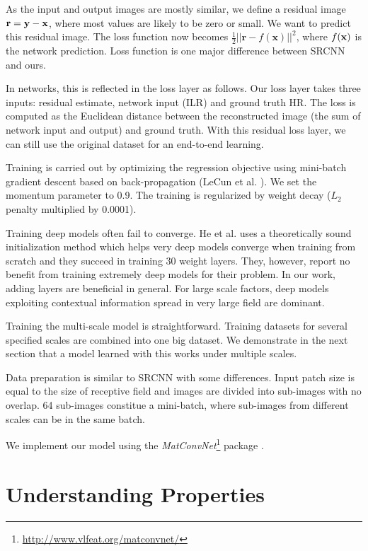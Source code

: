 \documentclass[10pt,twocolumn,letterpaper]{article}
\begin{document}
As the input and output images are mostly similar, we define a residual image ${\bf r}={\bf y}-{\bf x}$, where most values are likely to be zero or small. We want to predict this residual image. The loss function now becomes $\frac{1}{2}||\mathbf{r}-f(\mathbf{x})||^{2}$, where $f(\bf{x})$ is the network prediction. Loss function is one major difference between SRCNN and ours. 

In networks, this is reflected in the loss layer as follows. 
Our loss layer takes three inputs: residual estimate, network input (ILR) and ground truth HR. The loss is computed as the Euclidean distance between the reconstructed image (the sum of network input and output) and ground truth. With this residual loss layer, we can still use the original dataset for an end-to-end learning.

Training is carried out by optimizing the regression objective using mini-batch gradient descent based on back-propagation (LeCun et al. \cite{lecun1998gradient}). We set the momentum parameter to 0.9. The training is regularized by weight decay ($L_2$ penalty multiplied by
0.0001).  

Training deep models often fail to converge. He et al. \cite{he2015delving} uses a theoretically sound initialization method which helps very deep models converge when training from scratch and they succeed in training 30 weight layers. They, however, report no benefit from training extremely deep models for their problem. In our work, adding layers are beneficial in general. For large scale factors, deep models exploiting contextual information spread in very large field are dominant. 

Training the multi-scale model is straightforward. Training datasets for several specified scales are combined into one big dataset. We demonstrate in the next section that a model learned with this works under multiple scales.  

Data preparation is similar to SRCNN \cite{Dong2014} with some differences. Input patch size is equal to the size of receptive field and images are divided into sub-images with no overlap. 64 sub-images constitue a mini-batch, where sub-images from different scales can be in the same batch.

We implement our model using the \textit{MatConvNet}\footnote{\url{ http://www.vlfeat.org/matconvnet/}} package \cite{arXiv:1412.4564}.

\section{Understanding Properties}
\end{document}
